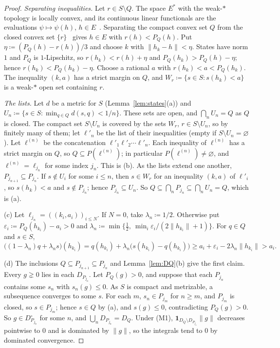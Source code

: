 \documentclass[11pt]{article}
\theoremstyle{definition}
\newcommand{\one}{\mathbf 1}
\begin{document}
\begin{proof}
\emph{Separating inequalities.} Let $r\in S\setminus Q$. The space $E^\ast$ with the weak-$\ast$ topology is locally convex, and its continuous linear functionals are the evaluations $\psi\mapsto\psi(h)$, $h\in E$~\cite[Theorem~3.10]{Rudin}. Separating the compact convex set $Q$ from the closed convex set $\{r\}$~\cite[Theorem~3.4]{Rudin} gives $h\in E$ with $r(h)<P_Q(h)$. Put $\eta\coloneqq(P_Q(h)-r(h))/3$ and choose $k$ with $\|h_k-h\|<\eta$. States have norm $1$ and $P_Q$ is $1$-Lipschitz, so $r(h_k)<r(h)+\eta$ and $P_Q(h_k)>P_Q(h)-\eta$; hence $r(h_k)<P_Q(h_k)-\eta$. Choose a rational $a$ with $r(h_k)<a<P_Q(h_k)$. The inequality $(k,a)$ has a strict margin on $Q$, and $W_r\coloneqq\{s\in S:s(h_k)<a\}$ is a weak-$\ast$ open set containing $r$.

\emph{The lists.} Let $d$ be a metric for $S$ (Lemma~\ref{lem:states}(a)) and $U_n\coloneqq\{s\in S:\min_{q\in Q}d(s,q)<1/n\}$. These sets are open, and $\bigcap_nU_n=Q$ as $Q$ is closed. The compact set $S\setminus U_n$ is covered by the sets $W_r$, $r\in S\setminus U_n$, so by finitely many of them; let $\ell'_n$ be the list of their inequalities (empty if $S\setminus U_n=\varnothing$). Let $\ell^{(n)}$ be the concatenation $\ell'_1\ell'_2\cdots\ell'_n$. Each inequality of $\ell^{(n)}$ has a strict margin on $Q$, so $Q\subseteq P(\ell^{(n)})$; in particular $P(\ell^{(n)})\ne\varnothing$, and $\ell^{(n)}=\ell_{j_n}$ for some index $j_n$. This is (b). As the lists extend one another, $P_{j_{n+1}}\subseteq P_{j_n}$. If $s\notin U_i$ for some $i\le n$, then $s\in W_r$ for an inequality $(k,a)$ of $\ell'_i$, so $s(h_k)<a$ and $s\notin P_{j_n}$; hence $P_{j_n}\subseteq U_n$. So $Q\subseteq\bigcap_nP_{j_n}\subseteq\bigcap_nU_n=Q$, which is (a).

(c) Let $\ell_{j_n}=((k_i,a_i))_{i\le N}$. If $N=0$, take $\lambda_n\coloneqq1/2$. Otherwise put $\varepsilon_i\coloneqq P_Q(h_{k_i})-a_i>0$ and $\lambda_n\coloneqq\min\bigl\{\tfrac12,\ \min_i\varepsilon_i/(2\|h_{k_i}\|+1)\bigr\}$. For $q\in Q$ and $s\in S$,
\[
\bigl((1-\lambda_n)q+\lambda_ns\bigr)(h_{k_i})=q(h_{k_i})+\lambda_n\bigl(s(h_{k_i})-q(h_{k_i})\bigr)\ge a_i+\varepsilon_i-2\lambda_n\|h_{k_i}\|>a_i .
\]

(d) The inclusions $Q\subseteq P_{j_{n+1}}\subseteq P_{j_n}$ and Lemma~\ref{lem:DQ}(b) give the first claim. Every $g\gneq0$ lies in each $D_{P_{j_n}}$. Let $P_Q(g)>0$, and suppose that each $P_{j_n}$ contains some $s_n$ with $s_n(g)\le0$. As $S$ is compact and metrizable, a subsequence converges to some $s$. For each $m$, $s_n\in P_{j_m}$ for $n\ge m$, and $P_{j_m}$ is closed, so $s\in P_{j_m}$; hence $s\in Q$ by (a), and $s(g)\le0$, contradicting $P_Q(g)>0$. So $g\in D^\circ_{P_{j_n}}$ for some $n$, and $\bigcup_nD_{P_{j_n}}=D_Q$. Under (M1), $\one_{D_Q\setminus D_{P_{j_n}}}\|g\|$ decreases pointwise to $0$ and is dominated by $\|g\|$, so the integrals tend to $0$ by dominated convergence.
\end{proof}
\end{document}
